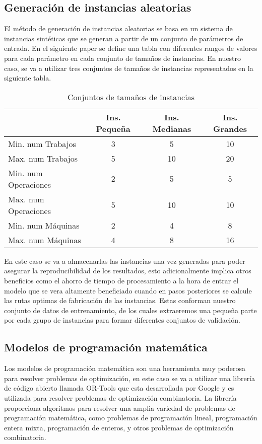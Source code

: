 \subsection{Generación de instancias aleatorias}
El método de generación de instancias aleatorias se basa en un sistema de instancias sintéticas
que se generan a partir de un conjunto de parámetros de entrada. En el siguiente paper \cite{pbrandimarte}
se define una tabla con diferentes rangos de valores para cada parámetro en cada conjunto de
tamaños de instancias. En nuestro caso, se va a utilizar tres conjuntos de tamaños de instancias
representados en la siguiente tabla.

\begin{table}[ht]
    \centering
    \begin{tabular}[t]{|l|ccc|}
        \hline
                  & Ins. Pequeña & Ins. Medianas & Ins. Grandes \\
        \hline
        Min. num Trabajos    & 3    & 5     & 10    \\
        Max. num Trabajos    & 5    & 10    & 20    \\
        Min. num Operaciones & 2    & 5     & 5     \\
        Max. num Operaciones & 5    & 10    & 10    \\
        Min. num Máquinas    & 2    & 4     & 8     \\
        Max. num Máquinas    & 4    & 8     & 16    \\
        \hline
    \end{tabular}
    \caption{Conjuntos de tamaños de instancias}
\end{table}

En este caso se va a almacenarlas las instancias una vez generadas para poder asegurar la reproducibilidad 
de los resultados, esto adicionalmente implica otros beneficios como el ahorro de tiempo de procesamiento
a la hora de entrar el modelo que se vera altamente beneficiado cuando en pasos posteriores se calcule
las rutas optimas de fabricación de las instancias. Estas conforman nuestro conjunto de datos de 
entrenamiento, de los cuales extraeremos una pequeña parte por cada grupo de instancias para formar
diferentes conjuntos de validación. 

\subsection{Modelos de programación matemática}
Los modelos de programación matemática son una herramienta muy poderosa para resolver problemas
de optimización, en este caso se va a utilizar una librería de código abierto llamada OR-Tools 
\cite{ortools} que esta desarrollada por Google y es utilizada para resolver problemas de optimización 
combinatoria. La librería proporciona algoritmos para resolver una amplia variedad de problemas 
de programación matemática, como problemas de programación lineal, programación entera mixta, 
programación de enteros, y otros problemas de optimización combinatoria.\medskip 

